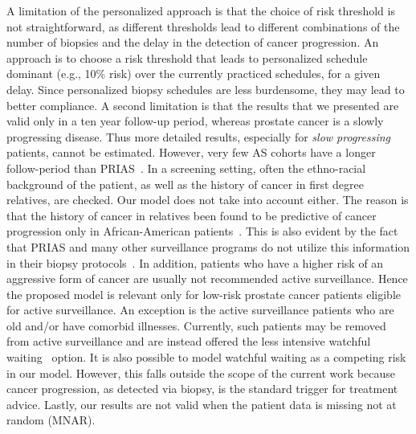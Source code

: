 A limitation of the personalized approach is that the choice of risk threshold is not straightforward, as different thresholds lead to different combinations of the number of biopsies and the delay in the detection of cancer progression. An approach is to choose a risk threshold that leads to personalized schedule dominant (e.g., 10\% risk) over the currently practiced schedules, for a given delay. Since personalized biopsy schedules are less burdensome, they may lead to better compliance. A second limitation is that the results that we presented are valid only in a ten year follow-up period, whereas prostate cancer is a slowly progressing disease. Thus more detailed results, especially for \emph{slow progressing} patients, cannot be estimated. However, very few AS cohorts have a longer follow-period than PRIAS~\citep{bruinsma2016active}. In a screening setting, often the ethno-racial background of the patient, as well as the history of cancer in first degree relatives, are checked. Our model does not take into account either. The reason is that the history of cancer in relatives been found to be predictive of cancer progression only in African-American patients~\citep{goh2013clinical,telang2017prostate}. This is also evident by the fact that PRIAS and many other surveillance programs do not utilize this information in their biopsy protocols~\citep{bokhorst2016decade,nieboer2018active}. In addition, patients who have a higher risk of an aggressive form of cancer are usually not recommended active surveillance. Hence the proposed model is relevant only for low-risk prostate cancer patients eligible for active surveillance. An exception is the active surveillance patients who are old and/or have comorbid illnesses. Currently, such patients may be removed from active surveillance and are instead offered the less intensive watchful waiting~\citep{bokhorst2016decade} option. It is also possible to model watchful waiting as a competing risk in our model. However, this falls outside the scope of the current work because cancer progression, as detected via biopsy, is the standard trigger for treatment advice. Lastly, our results are not valid when the patient data is missing not at random (MNAR).


